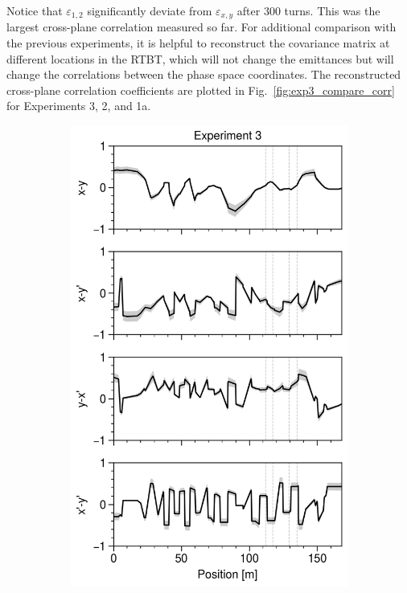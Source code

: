 Notice that $\varepsilon_{1,2}$ significantly deviate from $\varepsilon_{x,y}$ after 300 turns. This was the largest cross-plane correlation measured so far. For additional comparison with the previous experiments, it is helpful to reconstruct the covariance matrix at different locations in the RTBT, which will not change the emittances but will change the correlations between the phase space coordinates. The reconstructed cross-plane correlation coefficients are plotted in Fig.~\ref{fig:exp3_compare_corr} for Experiments 3, 2, and 1a.
%
\begin{figure}[!p]
    \centering
    \vspace*{3.0cm}
    \begin{subfigure}{0.32\textwidth}
        \includegraphics[width=\textwidth]{Images/chapter5/exp3/compare_corr.png}

\end{subfigure}
\end{figure}
